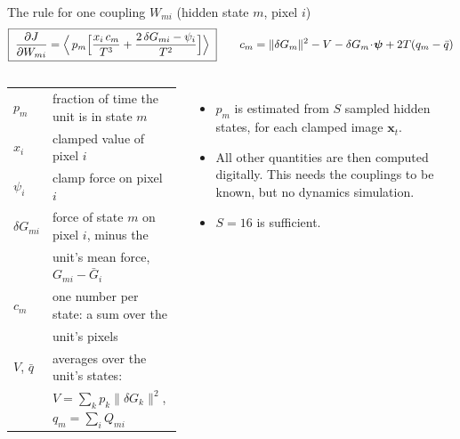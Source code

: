 \documentclass[aspectratio=169,10pt]{beamer}
\newcommand{\x}{\bm{x}}
\begin{document}
\begin{frame}{The rule for one coupling $W_{mi}$ (hidden state $m$, pixel $i$)}
  \[
    \boxed{\;\frac{\partial J}{\partial W_{mi}}
      =\Bigl\langle\,p_m\Bigl[\frac{x_i\,c_m}{T^{3}}+\frac{2\,\delta G_{mi}-\psi_i}{T^{2}}\Bigr]\Bigr\rangle\;}
    \qquad
    c_m=\lVert\delta G_m\rVert^{2}-V-\delta G_m\!\cdot\!\bm\psi+2T(q_m-\bar q)
  \]
  \begin{columns}[T,onlytextwidth]
      \small
      \begin{tabular}{@{}ll@{}}
        $p_m$ & fraction of time the unit is in state $m$\\
        $x_i$ & clamped value of pixel $i$\\
        $\psi_i$ & clamp force on pixel $i$\\
        $\delta G_{mi}$ & force of state $m$ on pixel $i$, minus the\\
                        & unit's mean force, $G_{mi}-\bar G_i$\\
        $c_m$ & one number per state: a sum over the\\
              & unit's pixels\\
        $V$, $\bar q$ & averages over the unit's states:\\
              & $V=\sum_k p_k\lVert\delta G_k\rVert^{2}$, \; $q_m=\sum_i Q_{mi}$
      \end{tabular}
      \vspace{0.2cm}
      \begin{itemize}\setlength{\itemsep}{8pt}
        \item $p_m$ is estimated from $S$ sampled hidden states, for each clamped image $\x_t$.
        \item All other quantities are then computed digitally. This needs the couplings to be known, but no dynamics simulation.
        \item $S=16$ is sufficient.
      \end{itemize}
  \end{columns}

\end{frame}
\end{document}
